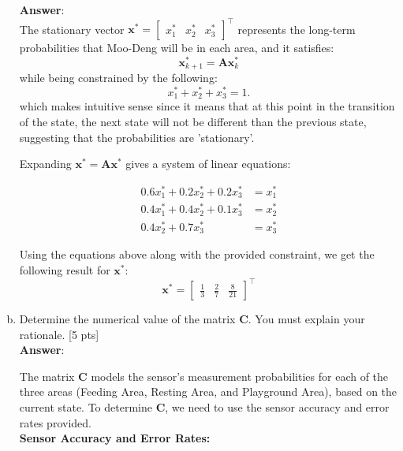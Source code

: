 \begin{enumerate}[a)]
    \textbf{Answer}: \\
    The stationary vector $\mathbf{x}^* = \begin{bmatrix} x_1^* & x_2^* & x_3^* \end{bmatrix}^\top$ represents the long-term probabilities that Moo-Deng will be in each area, and it satisfies:
    \[
    \mathbf{x}^*_{k+1} = \mathbf{A} \mathbf{x}^*_k
    \]
    while being constrained by the following:
    \[
    x_1^* + x_2^* + x_3^* = 1.
    \]
    which makes intuitive sense since it means that at this point in the transition of the state, the next state will not be different than the previous state, suggesting that the probabilities are 'stationary'.
    
    Expanding $\mathbf{x}^* = \mathbf{A} \mathbf{x}^*$ gives a system of linear equations:
    
    \begin{align*}
        0.6 x_1^* + 0.2 x_2^* + 0.2 x_3^* &= x_1^* \\
        0.4 x_1^* + 0.4 x_2^* + 0.1 x_3^* &= x_2^* \\
        0.4 x_2^* + 0.7 x_3^* &= x_3^*
    \end{align*}
    
Using the equations above along with the provided constraint, we get the following result for $\mathbf{x}^*$:
\[
\mathbf{x}^* = \begin{bmatrix} \frac{1}{3} & \frac{2}{7} & \frac{8}{21} \end{bmatrix}^\top
\]
    \item Determine the numerical value of the  matrix $\mathbf{C}$. You must explain your rationale. [5 pts] \\
    \textbf{Answer}:

    The matrix $\mathbf{C}$ models the sensor's measurement probabilities for each of the three areas (Feeding Area, Resting Area, and Playground Area), based on the current state. To determine $\mathbf{C}$, we need to use the sensor accuracy and error rates provided. \\
\textbf{Sensor Accuracy and Error Rates:}


\end{enumerate}
